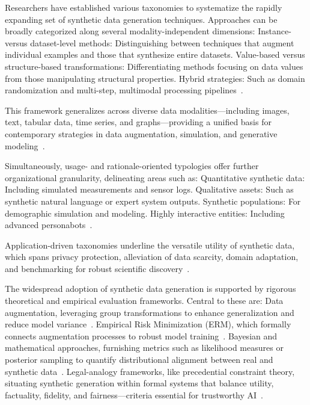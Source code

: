 \documentclass[sigconf]{acmart}
\begin{document}
Researchers have established various taxonomies to systematize the rapidly expanding set of synthetic data generation techniques. Approaches can be broadly categorized along several modality-independent dimensions:
Instance- versus dataset-level methods: Distinguishing between techniques that augment individual examples and those that synthesize entire datasets.
Value-based versus structure-based transformations: Differentiating methods focusing on data values from those manipulating structural properties.
Hybrid strategies: Such as domain randomization and multi-step, multimodal processing pipelines~\cite{ref1,ref13,ref64,ref81,ref87}.

This framework generalizes across diverse data modalities—including images, text, tabular data, time series, and graphs—providing a unified basis for contemporary strategies in data augmentation, simulation, and generative modeling~\cite{ref13,ref64,ref75,ref81,ref87,ref88}.

Simultaneously, usage- and rationale-oriented typologies offer further organizational granularity, delineating areas such as:
Quantitative synthetic data: Including simulated measurements and sensor logs.
Qualitative assets: Such as synthetic natural language or expert system outputs.
Synthetic populations: For demographic simulation and modeling.
Highly interactive entities: Including advanced personabots~\cite{ref87}.

Application-driven taxonomies underline the versatile utility of synthetic data, which spans privacy protection, alleviation of data scarcity, domain adaptation, and benchmarking for robust scientific discovery~\cite{ref87,ref88}.

The widespread adoption of synthetic data generation is supported by rigorous theoretical and empirical evaluation frameworks. Central to these are:
Data augmentation, leveraging group transformations to enhance generalization and reduce model variance~\cite{ref56,ref57}.
Empirical Risk Minimization (ERM), which formally connects augmentation processes to robust model training~\cite{ref56}.
Bayesian and mathematical approaches, furnishing metrics such as likelihood measures or posterior sampling to quantify distributional alignment between real and synthetic data~\cite{ref57,ref70,ref71}.
Legal-analogy frameworks, like precedential constraint theory, situating synthetic generation within formal systems that balance utility, factuality, fidelity, and fairness—criteria essential for trustworthy AI~\cite{ref84,ref87,ref88}.
\end{document}

